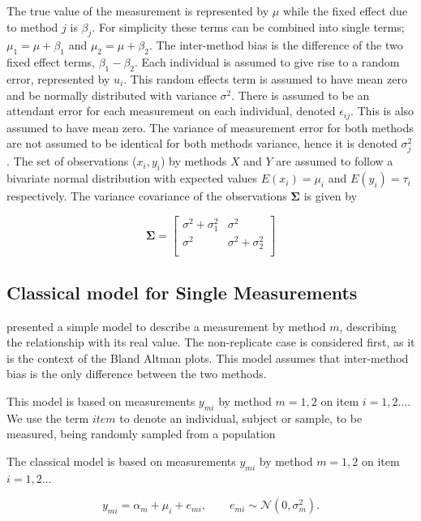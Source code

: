 \documentclass[12pt, a4paper]{report}
\theoremstyle{plain}
\theoremstyle{definition}
\theoremstyle{remark}
\begin{document}
The true value of the measurement is represented by $\mu$ while the fixed effect due to method $j$ is $\beta_{j}$.
For simplicity these terms can be combined into single terms; $\mu_{1} = \mu+ \beta_{1}$ and $\mu_{2} = \mu + \beta_{2}$. The inter-method bias is the difference of the two fixed effect terms, $\beta_{1}-\beta_{2}$. Each individual is assumed to give rise to a random error, represented by $u_{i}$. This random effects term is assumed to have mean zero and be normally distributed with variance $\sigma^2$. There is assumed to be an attendant error for each measurement on each individual, denoted $\epsilon_{ij}$. This is also assumed to have mean zero. The variance of measurement error for both methods are not assumed to be identical for both methods variance,  hence it is denoted $\sigma^2_{j}$. The set of observations ($x_{i},y_{i}$) by methods $X$ and $Y$ are assumed to follow a bivariate normal distribution with expected values $E(x_{i})= \mu_{i}$ and $E(y_{i})= \tau_{i}$ respectively. The variance covariance of the observations $\boldsymbol{\Sigma}$ is given by

\[
\boldsymbol{\Sigma} = \left[
\begin{array}{cc}
\sigma^{2} + \sigma^{2}_{1} & \sigma^{2} \\
\sigma^{2} & \sigma^{2} + \sigma^{2}_{2} \\
\end{array}
\right]
\] 


\subsection{Classical model for Single Measurements}

\citet{BXC2004} presented a simple model to describe a measurement by method $m$, describing the relationship with its real value. The non-replicate case is considered first, as it is the context of the Bland Altman plots. This model assumes that inter-method bias is the only difference between the two methods.

This model is based on measurements $y_{mi}$ by method $m=1,2$ on item $i = 1,2 \ldots$. We use the term $item$ to denote an individual, subject or sample, to be measured, being randomly sampled from a population

The classical model is based on measurements $y_{mi}$ by method $m=1,2$ on item $i = 1,2 \ldots$

\begin{equation}
y_{mi}  = \alpha_{m} + \mu_{i} + e_{mi}, \qquad  e_{mi} \sim
\mathcal{N}(0,\sigma^{2}_{m}).
\end{equation}
\end{document}
